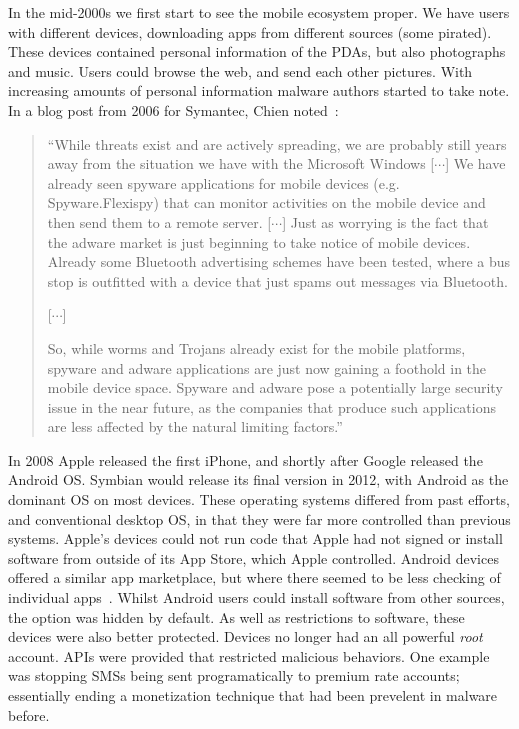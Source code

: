 \documentclass[thesis.tex]{subfiles}
\begin{document}
In the mid-2000s we first start to see the mobile
ecosystem proper.  We have users with different devices, downloading
apps from different sources (some pirated).  These devices
contained personal information of the \acp{PDA}, but also photographs
and music.  Users could browse the web, and send each other pictures.
With increasing amounts of personal information malware authors
started to take note.  In a blog post from 2006 for Symantec, Chien
noted~\cite{eric_chien_spyware_2006}:

\begin{quote}
  ``While threats exist and are actively spreading, we are probably
  still years away from the situation we have with the Microsoft Windows
  [$\cdots$] We have already seen spyware applications for mobile devices
  (e.g. Spyware.Flexispy) that can monitor activities on the mobile
  device and then send them to a remote server. [$\cdots$] Just as
  worrying is the fact that the adware market is just beginning to take
  notice of mobile devices. Already some Bluetooth advertising schemes
  have been tested, where a bus stop is outfitted with a device that
  just spams out messages via Bluetooth.

  [$\cdots$]
  
  So, while worms and Trojans already exist for the mobile
  platforms, spyware and adware applications are just now gaining a
  foothold in the mobile device space. Spyware and adware pose a
  potentially large security issue in the near future, as the companies
  that produce such applications are less affected by the natural
  limiting factors.''
\end{quote}

In 2008 Apple released the first iPhone, and shortly after Google
released the Android OS.  Symbian would release its final version in
2012, with Android as the dominant OS on most devices.  These
operating systems differed from past efforts, and conventional desktop
OS, in that they were far more controlled than previous systems.
Apple's devices could not run code that Apple had not signed or
install software from outside of its App Store, which Apple
controlled.  Android devices offered a similar app marketplace, but
where there seemed to be less checking of individual
apps~\cite{oberheide_dissecting_2012}. Whilst Android users could
install software from other sources, the option was hidden by default.
As well as restrictions to software, these devices were also better
protected.  Devices no longer had an all powerful \emph{root} account.
APIs were provided that restricted malicious behaviors.  One example
was stopping SMSs being sent programatically to premium rate accounts;
essentially ending a monetization technique that had been prevelent in
malware before. 
\end{document}
